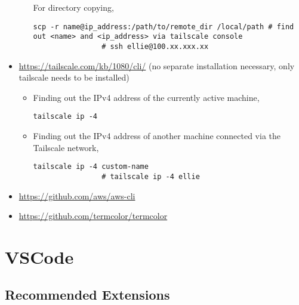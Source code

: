 \documentclass[12pt, a4paper]{article}
\numberwithin{equation}{section}
\theoremstyle{definition}
\theoremstyle{definition}
\begin{document}
\begin{itemize}
\begin{itemize}
			For directory copying, 
			
			\begin{lstlisting}[style=mystylepython, label=alg:tailscale__scp_dir, xleftmargin=\parindent]
				scp -r name@ip_address:/path/to/remote_dir /local/path # find out <name> and <ip_address> via tailscale console
				# ssh ellie@100.xx.xxx.xx
			\end{lstlisting}
			
		\end{itemize}
	
		\item \url{https://tailscale.com/kb/1080/cli/} (no separate installation necessary, only tailscale needs to be installed)
		
		\begin{itemize}
			\item Finding out the IPv4 address of the currently active machine,
			
			\begin{lstlisting}[style=mystylepython, label=alg:tailscale_ip, xleftmargin=\parindent]
				tailscale ip -4 
			\end{lstlisting}
			
			\item Finding out the IPv4 address of another machine connected via the Tailscale network,
			
			\begin{lstlisting}[style=mystylepython, label=alg:tailscale_ip, xleftmargin=\parindent]
				tailscale ip -4 custom-name
				# tailscale ip -4 ellie
			\end{lstlisting}
			
		\end{itemize}
		
		\item \url{https://github.com/aws/aws-cli}
		
		\item \url{https://github.com/termcolor/termcolor}
		
	\end{itemize}

\newpage 

\section{VSCode}

	\subsection{Recommended Extensions}
	
\end{document}
